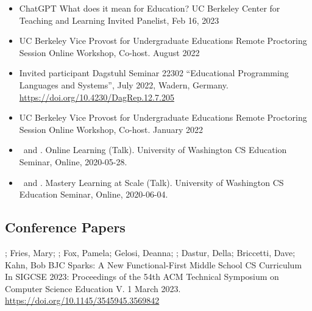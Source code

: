 \begin{itemize}
    \item{ChatGPT What does it mean for Education? UC Berkeley Center for Teaching and Learning 
    \newline
    Invited Panelist, Feb 16, 2023}
    
    \item{UC Berkeley Vice Provost for Undergraduate Educations Remote Proctoring Session
    \newline
    Online Workshop, Co-host. August 2022}
    
    \item{Invited participant Dagstuhl Seminar 22302
``Educational Programming Languages and Systems'', July 2022, Wadern, Germany.
    \newline  \small{\href{https://doi.org/10.4230/DagRep.12.7.205}{https://doi.org/10.4230/DagRep.12.7.205}}
    }
    
    \item{UC Berkeley Vice Provost for Undergraduate Educations Remote Proctoring Session
    \newline
    Online Workshop, Co-host. January 2022}

    \item{\me\ and \dan. Online Learning (Talk). University of Washington CS Education Seminar, Online, 2020-05-28.}
    
    \item{\me\ and \dan. Mastery Learning at Scale (Talk). University of Washington CS Education Seminar, Online, 2020-06-04.}
\end{itemize}

\subsection{Conference Papers}
\vspace{5pt}
\begin{etaremune}
    \setlength\itemsep{1em}
    \item{\dan; Fries, Mary; \me; Fox, Pamela;  Gelosi, Deanna; \lauren; Dastur, Della; Briccetti, Dave; Kahn, Bob
    \newline
    BJC Sparks: A New Functional-First Middle School CS Curriculum
    \newline In SIGCSE 2023: Proceedings of the 54th ACM Technical Symposium on Computer Science Education V. 1 March 2023.
    \newline
    \href{https://doi.org/10.1145/3545945.3569842}{https://doi.org/10.1145/3545945.3569842}}
\end{etaremune}

